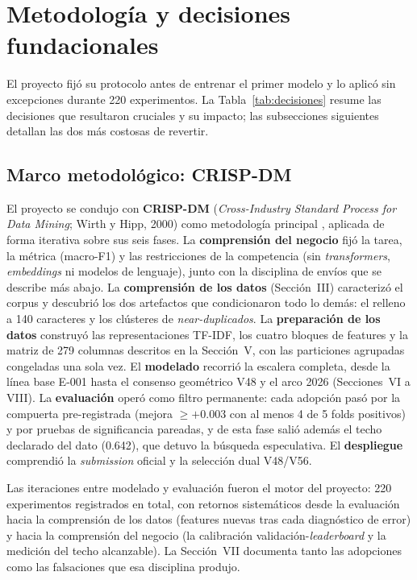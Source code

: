 \documentclass[journal]{IEEEtai}
\begin{document}
\section{Metodolog\'ia y decisiones fundacionales}

El proyecto fij\'o su protocolo antes de entrenar el primer modelo y lo aplic\'o sin excepciones durante 220 experimentos. La Tabla~\ref{tab:decisiones} resume las decisiones que resultaron cruciales y su impacto; las subsecciones siguientes detallan las dos m\'as costosas de revertir.

\subsection{Marco metodol\'ogico: CRISP-DM}

El proyecto se condujo con \textbf{CRISP-DM} (\textit{Cross-Industry Standard Process for Data
Mining}; Wirth y Hipp, 2000) como metodolog\'ia principal \cite{wirth2000}, aplicada de forma
iterativa sobre sus seis fases. La \textbf{comprensi\'on del negocio} fij\'o la tarea, la m\'etrica
(macro-F1) y las restricciones de la competencia (sin \textit{transformers}, \textit{embeddings}
ni modelos de lenguaje), junto con la disciplina de env\'ios que se describe m\'as abajo. La
\textbf{comprensi\'on de los datos} (Secci\'on~III) caracteriz\'o el corpus y descubri\'o los dos
artefactos que condicionaron todo lo dem\'as: el relleno a 140 caracteres y los cl\'usteres de
\textit{near-duplicados}. La \textbf{preparaci\'on de los datos} construy\'o las representaciones
TF-IDF, los cuatro bloques de features y la matriz de 279 columnas descritos en la Secci\'on~V,
con las particiones agrupadas congeladas una sola vez. El \textbf{modelado} recorri\'o la escalera
completa, desde la l\'inea base E-001 hasta el consenso geom\'etrico V48 y el arco 2026
(Secciones~VI a VIII). La \textbf{evaluaci\'on} oper\'o como filtro permanente: cada adopci\'on
pas\'o por la compuerta pre-registrada (mejora $\geq +0.003$ con al menos 4 de 5 folds positivos)
y por pruebas de significancia pareadas, y de esta fase sali\'o adem\'as el techo declarado del
dato (0.642), que detuvo la b\'usqueda especulativa. El \textbf{despliegue} comprendi\'o la
\textit{submission} oficial y la selecci\'on dual V48/V56.

Las iteraciones entre modelado y evaluaci\'on fueron el motor del proyecto: 220 experimentos
registrados en total, con retornos sistem\'aticos desde la evaluaci\'on hacia la comprensi\'on de
los datos (features nuevas tras cada diagn\'ostico de error) y hacia la comprensi\'on del negocio
(la calibraci\'on validaci\'on-\textit{leaderboard} y la medici\'on del techo alcanzable). La
Secci\'on~VII documenta tanto las adopciones como las falsaciones que esa disciplina produjo.
\end{document}

